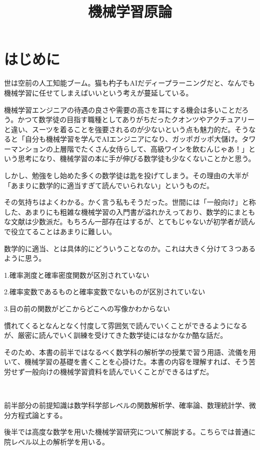 \documentclass{jsarticle}
\title{機械学習原論}
\author{}
\begin{document}
\maketitle
\section{はじめに}
世は空前の人工知能ブーム。猫も杓子もAIだディープラーニングだと、なんでも機械学習に任せてしまえばいいという考えが蔓延している。

機械学習エンジニアの待遇の良さや需要の高さを耳にする機会は多いことだろう。かつて数学徒の目指す職種としてありがちだったクオンツやアクチュアリーと違い、スーツを着ることを強要されるのが少ないという点も魅力的だ。そうなると「自分も機械学習を学んでAIエンジニアになり、ガッポガッポ大儲け。タワーマンションの上層階でたくさん女侍らして、高級ワインを飲むんじゃあ！」という思考になり、機械学習の本に手が伸びる数学徒も少なくないことかと思う。

しかし、勉強をし始めた多くの数学徒は匙を投げてしまう。その理由の大半が「あまりに数学的に適当すぎて読んでいられない」というものだ。

その気持ちはよくわかる。かく言う私もそうだった。世間には「一般向け」と称した、あまりにも粗雑な機械学習の入門書が溢れかえっており、数学的にまともな文献は少数派だ。もちろん一部存在はするが、とてもじゃないが初学者が読んで役立てることはあまりに難しい。

数学的に適当、とは具体的にどういうことなのか。これは大きく分けて３つあるように思う。

1.確率測度と確率密度関数が区別されていない

2.確率変数であるものと確率変数でないものが区別されていない

3.目の前の関数がどこからどこへの写像かわからない

慣れてくるとなんとなく忖度して雰囲気で読んでいくことができるようになるが、厳密に読んでいく訓練を受けてきた数学徒にはなかなか酷な話だ。

そのため、本書の前半ではなるべく数学科の解析学の授業で習う用語、流儀を用いて、機械学習の基礎を書くことを心掛けた。本書の内容を理解すれば、そう苦労せず一般向けの機械学習資料を読んでいくことができるはずだ。

　

前半部分の前提知識は数学科学部レベルの関数解析学、確率論、数理統計学、微分方程式論とする。

後半では高度な数学を用いた機械学習研究について解説する。こちらでは普通に院レベル以上の解析学を用いる。

\newpage
\end{document}
